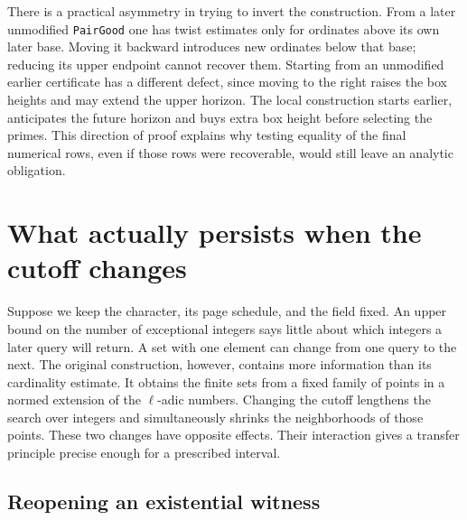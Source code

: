 \documentclass[12pt,letterpaper]{article}
\begin{document}
There is a practical asymmetry in trying to invert the construction. From a later unmodified \texttt{PairGood} one has twist estimates only for ordinates above its own later base. Moving it backward introduces new ordinates below that base; reducing its upper endpoint cannot recover them. Starting from an unmodified earlier certificate has a different defect, since moving to the right raises the box heights and may extend the upper horizon. The local construction starts earlier, anticipates the future horizon and buys extra box height before selecting the primes. This direction of proof explains why testing equality of the final numerical rows, even if those rows were recoverable, would still leave an analytic obligation.


\section{What actually persists when the cutoff changes}

Suppose we keep the character, its page schedule, and the field fixed. An upper bound on the number of exceptional integers says little about which integers a later query will return. A set with one element can change from one query to the next. The original construction, however, contains more information than its cardinality estimate. It obtains the finite sets from a fixed family of points in a normed extension of the $\ell$-adic numbers. Changing the cutoff lengthens the search over integers and simultaneously shrinks the neighborhoods of those points. These two changes have opposite effects. Their interaction gives a transfer principle precise enough for a prescribed interval.

\subsection{Reopening an existential witness}
\end{document}
